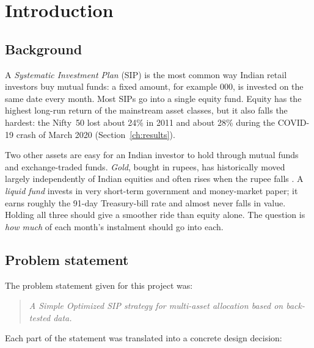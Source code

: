 \section{Introduction}
\label{ch:intro}

\subsection{Background}

A \emph{Systematic Investment Plan} (SIP) is the most common way Indian retail investors buy
mutual funds: a fixed amount, for example 000, is invested on the same date every month.
Most SIPs go into a single equity fund. Equity has the highest long-run return of the
mainstream asset classes, but it also falls the hardest: the Nifty~50 lost about 24\% in 2011 and
about 28\% during the COVID-19 crash of March 2020 (Section~\ref{ch:results}).

Two other assets are easy for an Indian investor to hold through mutual funds and exchange-traded
funds. \emph{Gold}, bought in rupees, has historically moved largely independently of Indian equities
and often rises when the rupee falls \citep{baur2010}. A \emph{liquid fund} invests in very
short-term government and money-market paper; it earns roughly the 91-day Treasury-bill rate and
almost never falls in value. Holding all three should give a smoother ride than equity alone. The
question is \emph{how much} of each month's instalment should go into each.

\subsection{Problem statement}

The problem statement given for this project was:

\begin{quote}
\emph{A Simple Optimized SIP strategy for multi-asset allocation based on back-tested data.}
\end{quote}

Each part of the statement was translated into a concrete design decision:

